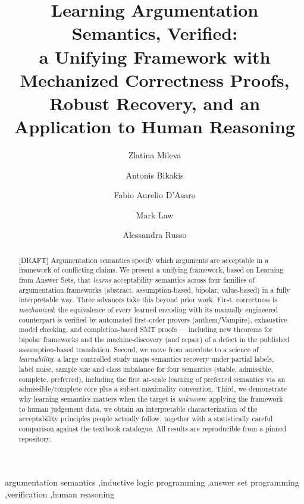 \documentclass[preprint,12pt]{elsarticle}
\begin{document}
\begin{frontmatter}

\title{Learning Argumentation Semantics, Verified:\\
a Unifying Framework with Mechanized Correctness Proofs,\\
Robust Recovery, and an Application to Human Reasoning}

\author[imperial]{Zlatina Mileva}
\author[ucl]{Antonis Bikakis}
\author[verona]{Fabio Aurelio D'Asaro}
\author[ilasp]{Mark Law}
\author[imperial]{Alessandra Russo}
\address[imperial]{Imperial College London, UK}
\address[ucl]{University College London, UK}
\address[verona]{University of Verona, Italy}
\address[ilasp]{ILASP Limited, UK}

\begin{abstract}
[DRAFT] Argumentation semantics specify which arguments are acceptable in a
framework of conflicting claims. We present a unifying framework, based on
Learning from Answer Sets, that \emph{learns} acceptability semantics across four
families of argumentation frameworks (abstract, assumption-based, bipolar,
value-based) in a fully interpretable way. Three advances take this beyond prior
work. First, correctness is \emph{mechanized}: the equivalence of every learned
encoding with its manually engineered counterpart is verified by automated
first-order provers (anthem/Vampire), exhaustive model checking, and
completion-based SMT proofs --- including new theorems for bipolar frameworks and
the machine-discovery (and repair) of a defect in the published assumption-based
translation. Second, we move from anecdote to a science of \emph{learnability}: a
large controlled study maps semantics recovery under partial labels, label noise,
sample size and class imbalance for four semantics (stable, admissible, complete,
preferred), including the first at-scale learning of preferred semantics via an
admissible/complete core plus a subset-maximality convention. Third, we demonstrate why
learning semantics matters when the target is \emph{unknown}: applying the
framework to human judgement data, we obtain an interpretable characterization of
the acceptability principles people actually follow, together with a
statistically careful comparison against the textbook catalogue. All results are
reproducible from a pinned repository.
\end{abstract}

\begin{keyword}
argumentation semantics \sep inductive logic programming \sep answer set
programming \sep verification \sep human reasoning
\end{keyword}
\end{frontmatter}
\end{document}
